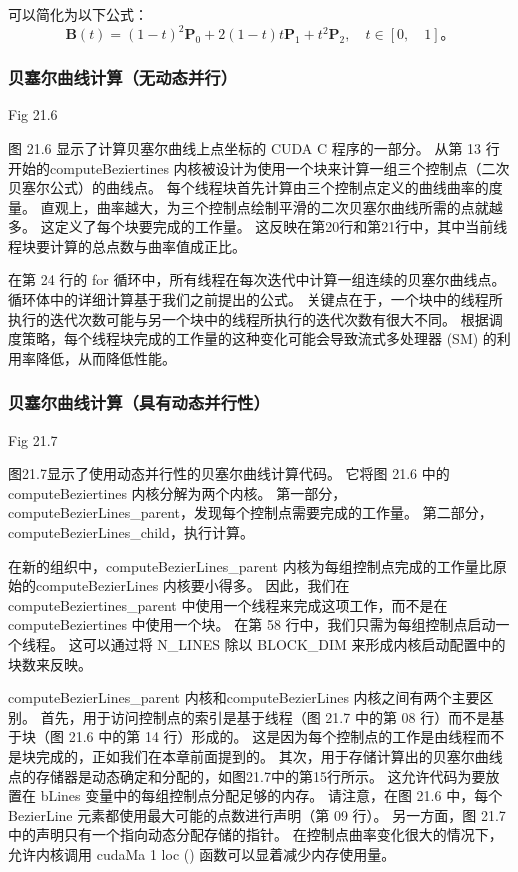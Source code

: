 可以简化为以下公式：
$$
\mathbf{B}(t)=(1-t)^{2} \mathbf{P}_{0}+2(1-t) t \mathbf{P}_{1}+t^{2} \mathbf{P}_{2}, \quad t \in[0, \quad 1] 。
$$

\subsubsection{贝塞尔曲线计算（无动态并行）}
{\color{red} Fig 21.6}

图 21.6 显示了计算贝塞尔曲线上点坐标的 CUDA C 程序的一部分。 
从第 13 行开始的computeBeziertines 内核被设计为使用一个块来计算一组三个控制点（二次贝塞尔公式）的曲线点。 
每个线程块首先计算由三个控制点定义的曲线曲率的度量。 直观上，曲率越大，为三个控制点绘制平滑的二次贝塞尔曲线所需的点就越多。 
这定义了每个块要完成的工作量。 这反映在第20行和第21行中，其中当前线程块要计算的总点数与曲率值成正比。

在第 24 行的 for 循环中，所有线程在每次迭代中计算一组连续的贝塞尔曲线点。 循环体中的详细计算基于我们之前提出的公式。 
关键点在于，一个块中的线程所执行的迭代次数可能与另一个块中的线程所执行的迭代次数有很大不同。 
根据调度策略，每个线程块完成的工作量的这种变化可能会导致流式多处理器 (SM) 的利用率降低，从而降低性能。

\subsubsection{贝塞尔曲线计算（具有动态并行性）}
{\color{red} Fig 21.7}

图21.7显示了使用动态并行性的贝塞尔曲线计算代码。 它将图 21.6 中的computeBeziertines 内核分解为两个内核。 
第一部分，computeBezierLines\_parent，发现每个控制点需要完成的工作量。 
第二部分，computeBezierLines\_child，执行计算。

在新的组织中，computeBezierLines\_parent 内核为每组控制点完成的工作量比原始的computeBezierLines 内核要小得多。 
因此，我们在computeBeziertines\_parent 中使用一个线程来完成这项工作，而不是在computeBeziertines 中使用一个块。 
在第 58 行中，我们只需为每组控制点启动一个线程。 
这可以通过将 N\_LINES 除以 BLOCK\_DIM 来形成内核启动配置中的块数来反映。

computeBezierLines\_parent 内核和computeBezierLines 内核之间有两个主要区别。 
首先，用于访问控制点的索引是基于线程（图 21.7 中的第 08 行）而不是基于块（图 21.6 中的第 14 行）形成的。 
这是因为每个控制点的工作是由线程而不是块完成的，正如我们在本章前面提到的。 
其次，用于存储计算出的贝塞尔曲线点的存储器是动态确定和分配的，如图21.7中的第15行所示。 
这允许代码为要放置在 bLines 变量中的每组控制点分配足够的内存。 
请注意，在图 21.6 中，每个 BezierLine 元素都使用最大可能的点数进行声明（第 09 行）。 
另一方面，图 21.7 中的声明只有一个指向动态分配存储的指针。 
在控制点曲率变化很大的情况下，允许内核调用 cudaMa 1 loc () 函数可以显着减少内存使用量。

